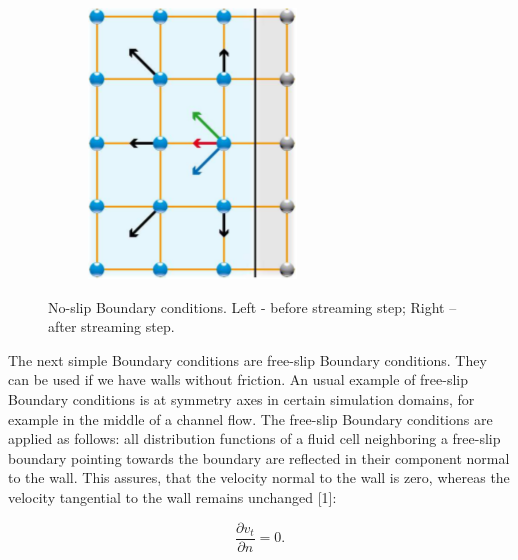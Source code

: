 \begin{figure}[H]
\begin{subfigure}[h]{0.3\textwidth}
    \includegraphics[width=\textwidth]{img/fig8-2.png}
  \end{subfigure}
  \caption{No-slip Boundary conditions. Left - before streaming step; Right – after streaming step.}
\end{figure}

The next simple Boundary conditions are free-slip Boundary conditions. They can be used if we have walls without friction. An usual example of free-slip Boundary conditions is at symmetry axes in certain simulation domains, for example in the middle of a channel flow. The free-slip Boundary conditions are applied as follows: all distribution functions of a fluid cell neighboring a free-slip boundary pointing towards the boundary are reflected in their component normal to the wall. This assures, that the velocity normal to the wall is zero, whereas the velocity tangential to the wall remains unchanged [1]:

\begin{equation}
\frac{\partial v_t}{\partial n} = 0.
\end{equation}

